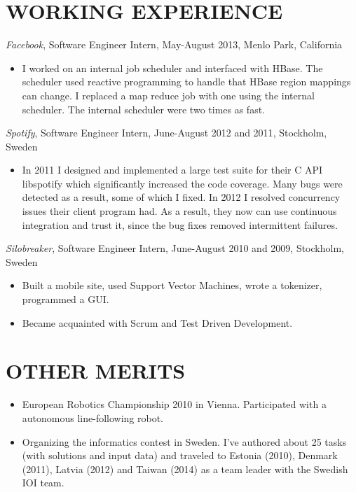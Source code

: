 \documentclass[11pt]{res} %
\begin{document}
\begin{resume}
\section{WORKING EXPERIENCE}
\emph{Facebook}, {\footnotesize Software Engineer Intern, May-August 2013}, Menlo Park, California
\vspace{0.2in}
   \begin{itemize}
   \item I worked on an internal job scheduler and interfaced with HBase. The
     scheduler used reactive programming to handle that HBase region mappings
     can change. I replaced a map reduce job with one using the internal
     scheduler. The internal scheduler were two times as fast.
 \end{itemize}

 \emph{Spotify}, {\footnotesize Software Engineer Intern, June-August 2012 and 2011}, Stockholm, Sweden
\vspace{0.2in}
   \begin{itemize} %
   \item In 2011 I designed and implemented a large test suite for their C API
     libspotify which significantly increased the code coverage. Many bugs were
     detected as a result, some of which I fixed. In 2012 I resolved
     concurrency issues their client program had. As a result, they now can use
     continuous integration and trust it, since the bug fixes removed
     intermittent failures.

 \end{itemize}


 \emph{Silobreaker}, {\footnotesize Software Engineer Intern, June-August 2010 and 2009}, Stockholm, Sweden
\vspace{0.2in}
 \begin{itemize} %
  \item Built a mobile site, used Support Vector Machines, wrote a tokenizer,
   programmed a GUI.
  \item Became acquainted with Scrum and Test Driven Development.
\end{itemize}

\section{OTHER MERITS}

   \begin{itemize} %
   \item European Robotics Championship 2010 in Vienna.
    Participated with a autonomous line-following robot.
   \item Organizing the informatics contest in Sweden.  I've authored about
     25 tasks (with solutions and input data) and traveled to Estonia (2010),
     Denmark (2011), Latvia (2012) and Taiwan (2014) as a team leader with the Swedish IOI
     team.
 \end{itemize}

\end{resume}
\end{document}
